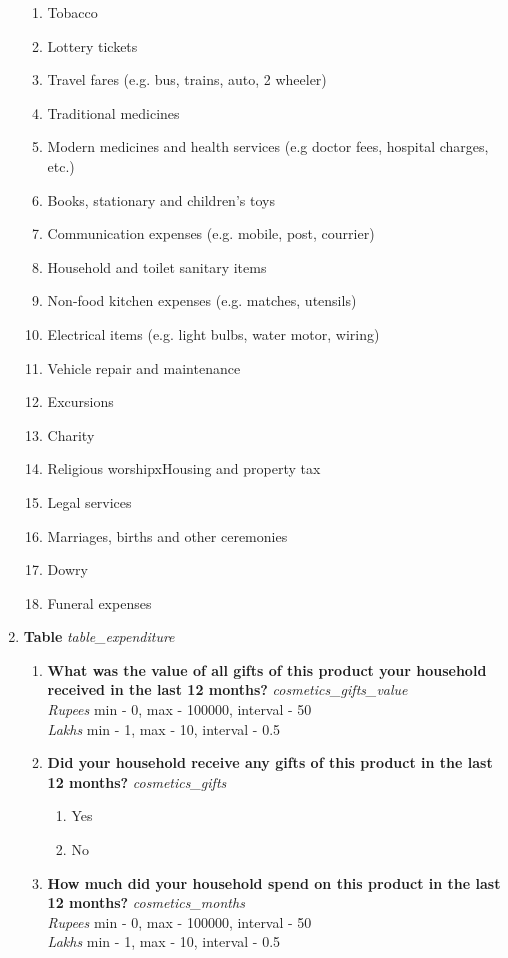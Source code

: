 \documentclass{article}
\begin{document}
\begin{enumerate}
\begin{enumerate}
\item Tobacco
\item Lottery tickets
\item Travel fares (e.g. bus, trains, auto, 2 wheeler)
\item Traditional medicines
\item Modern medicines and health services (e.g doctor fees, hospital charges, etc.)
\item Books, stationary and children's toys
\item Communication expenses (e.g. mobile, post, courrier)
\item Household and toilet sanitary items
\item  Non-food kitchen expenses (e.g. matches, utensils)
\item Electrical items (e.g. light bulbs, water motor, wiring)
\item Vehicle repair and maintenance
\item Excursions
\item Charity
\item Religious worshipxHousing and property tax
\item Legal services
\item Marriages, births and other ceremonies
\item Dowry
\item Funeral expenses
\end{enumerate}
\item {\bfseries Table}\emph{ table\_expenditure }
\begin{enumerate}[label*=\arabic*.]
\item {\bfseries What was the value of all gifts of this product your household received in the last 12 months?}\emph{ cosmetics\_gifts\_value }
\\ \emph{ Rupees }min - 0, max - 100000, interval - 50
\\ \emph{ Lakhs }min - 1, max - 10, interval - 0.5

\item {\bfseries Did your household receive any gifts of this product in the last 12 months?}\emph{ cosmetics\_gifts }
\begin{enumerate}
\item Yes
\item No
\end{enumerate}
\item {\bfseries How much did your household spend on this product in the last 12 months?}\emph{ cosmetics\_months }
\\ \emph{ Rupees }min - 0, max - 100000, interval - 50
\\ \emph{ Lakhs }min - 1, max - 10, interval - 0.5


\end{enumerate}
\end{enumerate}
\end{document}
